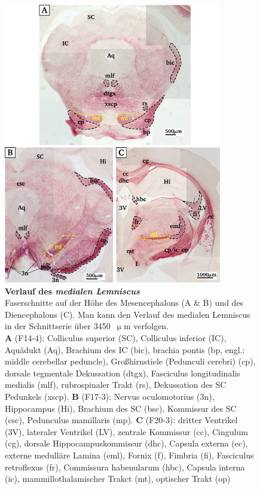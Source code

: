 \documentclass[12pt,a4paper,pdftex]{article}
\begin{document}
\begin{figure}[H]
    \centering
    \includegraphics[width = 0.85\textwidth] {pictures/somatosensory/medial_lemniscus.png}
    \caption[Verlauf des \textit{medialen Lemniscus}]{\small{\textbf{Verlauf des \textit{medialen Lemniscus}}\\
    Faserschnitte auf der Höhe des Mesencephalons (A \& B) und des Diencephalons (C). Man kann den Verlauf des medialen Lemniscus in der Schnittserie über 3450~$\upmu$m verfolgen.\\
    \textbf{A} (F14-4): Colliculus superior (SC), Colliculus inferior (IC), Aquädukt (Aq), Brachium des IC (bic), brachia pontis (bp, engl.: middle cerebellar peduncle), Großhirnstiele (Pedunculi cerebri) (cp), dorsale tegmentale Dekussation (dtgx), Fasciculus longitudinalis medialis (mlf), rubrospinaler Trakt (rs), Dekussation des SC Pedunkels (xscp).
    \textbf{B} (F17-3): Nervus oculomotorius (3n), Hippocampus (Hi), Brachium des SC (bsc), Kommissur des SC (csc), Pedunculus mamillaris (mp).
    \textbf{C} (F20-3): dritter Ventrikel (3V), lateraler Ventrikel (LV), zentrale Kommissur (cc), Cingulum (cg), dorsale Hippocampuskommissur (dhc), Capsula externa (ec), externe medulläre Lamina (eml), Fornix (f), Fimbria (fi), Fasciculus retroflexus (fr), Commissura habenularum (hbc), Capsula interna (ic), mammillothalamischer Trakct (mt), optischer Trakt (op)}}
    \label{fig:medialer_lemniscus}
\end{figure}
\end{document}
